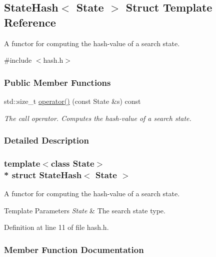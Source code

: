 \hypertarget{structStateHash}{}\subsection{State\+Hash$<$ State $>$ Struct Template Reference}
\label{structStateHash}


A functor for computing the hash-\/value of a search state.  




{\ttfamily \#include $<$hash.\+h$>$}

\subsubsection*{Public Member Functions}
\begin{DoxyCompactItemize}
\item 
std\+::size\+\_\+t \hyperlink{structStateHash_a2be34f2df09b89f6591fbaba31d65b34}{operator()} (const State \&s) const 
\begin{DoxyCompactList}\small\item\em The call operator. Computes the hash-\/value of a search state. \end{DoxyCompactList}\end{DoxyCompactItemize}


\subsubsection{Detailed Description}
\subsubsection*{template$<$class State$>$\\*
struct State\+Hash$<$ State $>$}

A functor for computing the hash-\/value of a search state. 


\begin{DoxyTemplParams}{Template Parameters}
{\em State} & The search state type. \\
\hline
\end{DoxyTemplParams}


Definition at line 11 of file hash.\+h.



\subsubsection{Member Function Documentation}
